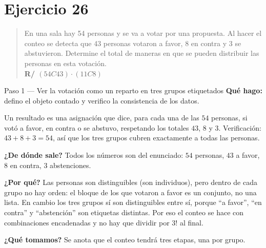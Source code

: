\documentclass[11pt]{article}
\begin{document}
\section*{Ejercicio 26}

\begin{quote}
En una sala hay 54 personas y se va a votar por una propuesta. Al hacer el conteo se detecta que 43 personas votaron a favor, 8 en contra y 3 se abstuvieron. Determine el total de maneras en que se pueden distribuir las personas en esta votación.\\[2pt]
\textbf{R/ $(54C43)\cdot(11C8)$}
\end{quote}

\begin{paso}{Paso 1 --- Ver la votación como un reparto en tres grupos etiquetados}
\textbf{Qué hago:} defino el objeto contado y verifico la consistencia de los datos.

Un resultado es una asignación que dice, para cada una de las $54$ personas, si votó a favor, en contra o se abstuvo, respetando los totales $43$, $8$ y $3$. Verificación: $43+8+3=54$, así que los tres grupos cubren exactamente a todas las personas.

\textbf{¿De dónde sale?} Todos los números son del enunciado: $54$ personas, $43$ a favor, $8$ en contra, $3$ abstenciones.

\textbf{¿Por qué?} Las personas son distinguibles (son individuos), pero dentro de cada grupo no hay orden: el bloque de los que votaron a favor es un conjunto, no una lista. En cambio los tres grupos sí son distinguibles entre sí, porque ``a favor'', ``en contra'' y ``abstención'' son etiquetas distintas. Por eso el conteo se hace con combinaciones encadenadas y no hay que dividir por $3!$ al final.

\textbf{¿Qué tomamos?} Se anota que el conteo tendrá tres etapas, una por grupo.
\end{paso}
\end{document}
